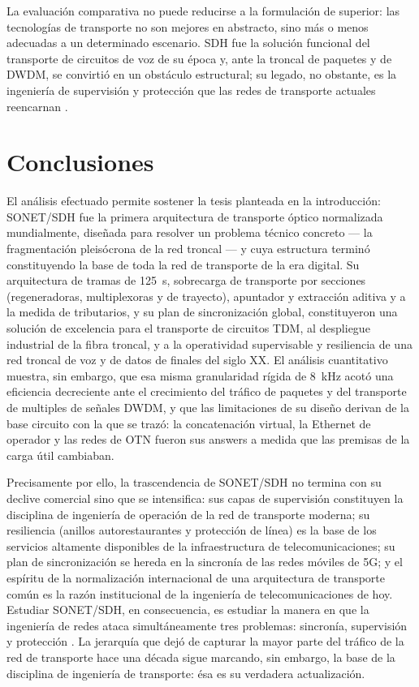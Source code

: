 \documentclass[12pt,a4paper]{article}
\begin{document}
La evaluación comparativa no puede reducirse a la formulación de superior: las tecnologías de transporte no son mejores en abstracto, sino más o menos adecuadas a un determinado escenario. SDH fue la solución funcional del transporte de circuitos de voz de su época y, ante la troncal de paquetes y de DWDM, se convirtió en un obstáculo estructural; su legado, no obstante, es la ingeniería de supervisión y protección que las redes de transporte actuales reencarnan \cite{ituotn, ituG803, kurose2017}.

\section{Conclusiones}

El análisis efectuado permite sostener la tesis planteada en la introducción: SONET/SDH fue la primera arquitectura de transporte óptico normalizada mundialmente, diseñada para resolver un problema técnico concreto --- la fragmentación pleisócrona de la red troncal --- y cuya estructura terminó constituyendo la base de toda la red de transporte de la era digital. Su arquitectura de tramas de 125~\textmu s, sobrecarga de transporte por secciones (regeneradoras, multiplexoras y de trayecto), apuntador y extracción aditiva y a la medida de tributarios, y su plan de sincronización global, constituyeron una solución de excelencia para el transporte de circuitos TDM, al despliegue industrial de la fibra troncal, y a la operatividad supervisable y resiliencia de una red troncal de voz y de datos de finales del siglo XX. El análisis cuantitativo muestra, sin embargo, que esa misma granularidad rígida de 8~kHz acotó una eficiencia decreciente ante el crecimiento del tráfico de paquetes y del transporte de multiples de señales DWDM, y que las limitaciones de su diseño derivan de la base circuito con la que se trazó: la concatenación virtual, la Ethernet de operador y las redes de OTN fueron sus answers a medida que las premisas de la carga útil cambiaban.

Precisamente por ello, la trascendencia de SONET/SDH no termina con su declive comercial sino que se intensifica: sus capas de supervisión constituyen la disciplina de ingeniería de operación de la red de transporte moderna; su resiliencia (anillos autorestaurantes y protección de línea) es la base de los servicios altamente disponibles de la infraestructura de telecomunicaciones; su plan de sincronización se hereda en la sincronía de las redes móviles de 5G; y el espíritu de la normalización internacional de una arquitectura de transporte común es la razón institucional de la ingeniería de telecomunicaciones de hoy. Estudiar SONET/SDH, en consecuencia, es estudiar la manera en que la ingeniería de redes ataca simultáneamente tres problemas: sincronía, supervisión y protección \cite{itug707, ituG803, ituotn, ituG8261}. La jerarquía que dejó de capturar la mayor parte del tráfico de la red de transporte hace una década sigue marcando, sin embargo, la base de la disciplina de ingeniería de transporte: ésa es su verdadera actualización.
\end{document}

